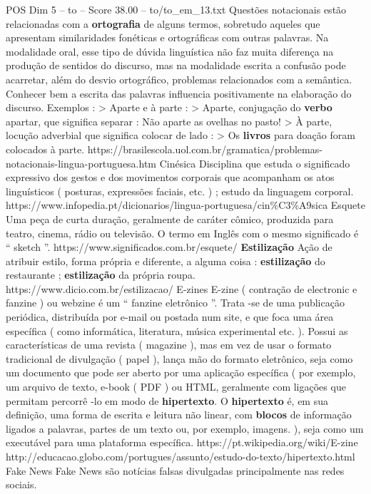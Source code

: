 \begin{textsample}{POS Dim 5 – to – Score 38.00 – to/to\_em\_13.txt}
Questões notacionais estão relacionadas com a \textbf{ortografia} de alguns termos, sobretudo aqueles que apresentam similaridades fonéticas e ortográficas com outras palavras.
Na modalidade oral, esse tipo de dúvida linguística não faz muita diferença na produção de sentidos do discurso, mas na modalidade escrita a confusão pode acarretar, além do desvio ortográfico, problemas relacionados com a semântica.
Conhecer bem a escrita das palavras influencia positivamente na elaboração do discurso.
Exemplos : > Aparte e à parte : > Aparte, conjugação do \textbf{verbo} apartar, que significa separar : Não aparte as ovelhas no pasto! > À parte, locução adverbial que significa colocar de lado : > Os \textbf{livros} para doação foram colocados à parte. https://brasilescola.uol.com.br/gramatica/problemas-notacionais-lingua-portuguesa.htm Cinésica Disciplina que estuda o significado expressivo dos gestos e dos movimentos corporais que acompanham os atos linguísticos ( posturas, expressões faciais, etc. ) ; estudo da linguagem corporal. https://www.infopedia.pt/dicionarios/lingua-portuguesa/cin\%C3\%A9sica Esquete Uma peça de curta duração, geralmente de caráter cômico, produzida para teatro, cinema, rádio ou televisão.
O termo em Inglês com o mesmo significado é “ sketch ”. https://www.significados.com.br/esquete/ \textbf{Estilização} Ação de atribuir estilo, forma própria e diferente, a alguma coisa : \textbf{estilização} do restaurante ; \textbf{estilização} da própria roupa. https://www.dicio.com.br/estilizacao/ E-zines E-zine ( contração de electronic e fanzine ) ou webzine é um “ fanzine eletrônico ”.
Trata -se de uma publicação periódica, distribuída por e-mail ou postada num site, e que foca uma área específica ( como informática, literatura, música experimental etc. ).
Possui as características de uma revista ( magazine ), mas em vez de usar o formato tradicional de divulgação ( papel ), lança mão do formato eletrônico, seja como um documento que pode ser aberto por uma aplicação específica ( por exemplo, um arquivo de texto, e-book ( PDF ) ou HTML, geralmente com ligações que permitam percorrê -lo em modo de \textbf{hipertexto}.
O \textbf{hipertexto} é, em sua definição, uma forma de escrita e leitura não linear, com \textbf{blocos} de informação ligados a palavras, partes de um texto ou, por exemplo, imagens. ), seja como um executável para uma plataforma específica. https://pt.wikipedia.org/wiki/E-zine http://educacao.globo.com/portugues/assunto/estudo-do-texto/hipertexto.html Fake News Fake News são notícias falsas divulgadas principalmente nas redes sociais.

\end{textsample}
